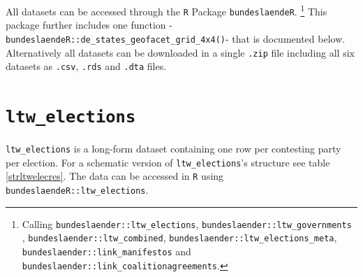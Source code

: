\documentclass[
]{scrartcl}
\begin{document}
All datasets can be accessed through the \texttt{R} Package
\texttt{bundeslaendeR}.
\footnote{Calling \texttt{bundeslaender::ltw\_elections}, \texttt{bundeslaender::ltw\_governments} , \texttt{bundeslaender::ltw\_combined},
\texttt{bundeslaender::ltw\_elections\_meta}, \texttt{bundeslaender::link\_manifestos} and \texttt{bundeslaender::link\_coalitionagreements}.}
This package further includes one function
-\texttt{bundeslaendeR::de\_states\_geofacet\_grid\_4x4()}- that is
documented below. Alternatively all datasets can be downloaded in a
single \texttt{.zip} file including all six datasets as \texttt{.csv},
\texttt{.rds} and \texttt{.dta} files.

\newpage

\hypertarget{ltw_elections}{%
\section{\texorpdfstring{\texttt{ltw\_elections}}{ltw\_elections}}\label{ltw_elections}}

\texttt{ltw\_elections} is a long-form dataset containing one row per
contesting party per election. For a schematic version of
\texttt{ltw\_elections}'s structure see table\(~\)\ref{strltwelecres}.
The data can be accessed in \texttt{R} using
\texttt{bundeslaendeR::ltw\_elections}.
\end{document}

